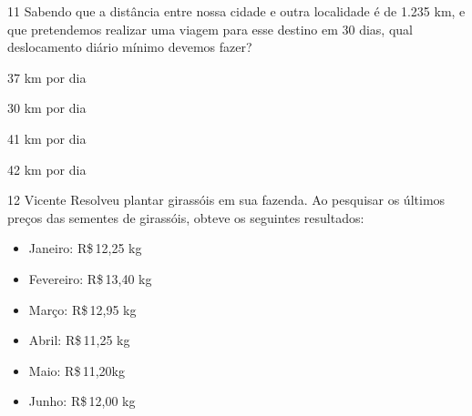 

\num{11} Sabendo que a distância entre nossa cidade e outra localidade é de
1.235 km, e que pretendemos realizar uma viagem para esse destino em 30
dias, qual deslocamento diário mínimo devemos fazer?

\begin{escolha}
\item 37 km por dia
\item 30 km por dia
\item 41 km por dia
\item 42 km por dia
\end{escolha}







\num{12} Vicente Resolveu plantar girassóis em sua fazenda. Ao pesquisar os
últimos preços das sementes de girassóis, obteve os seguintes
resultados:

\begin{itemize}
\item Janeiro: R\$\,12,25 kg
\item Fevereiro: R\$\,13,40 kg
\item Março: R\$\,12,95 kg
\item Abril: R\$\,11,25 kg
\item Maio: R\$\,11,20kg
\item Junho: R\$\,12,00 kg
\end{itemize}

